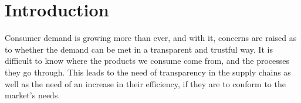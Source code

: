 \chapter{Introduction}
\label{chap:introduction}
\minitoc \mtcskip \noindent

Consumer demand is growing more than ever, and with it, concerns are raised as to whether the demand can be met in a transparent and trustful way. It is difficult to know where the products we consume come from, and the processes they go through. This leads to the need of transparency in the supply chains as well as the need of an increase in their efficiency, if they are to conform to the market's needs.



